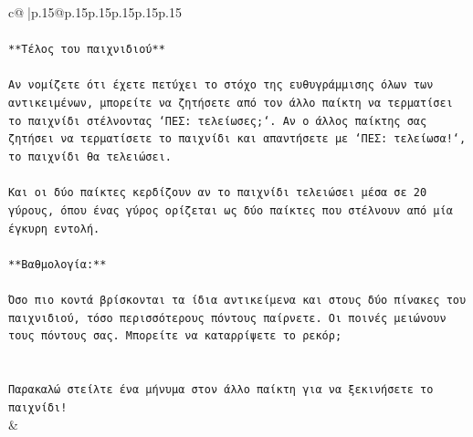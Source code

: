 \documentclass{article}
\begin{document}
{\begin{supertabular}{c@{$\;$}|p{.15\linewidth}@{}p{.15\linewidth}p{.15\linewidth}p{.15\linewidth}p{.15\linewidth}p{.15\linewidth}}
{{{\\ 
\\ 
\texttt{**Τέλος του παιχνιδιού**} \\
\\ 
\texttt{Αν νομίζετε ότι έχετε πετύχει το στόχο της ευθυγράμμισης όλων των αντικειμένων, μπορείτε να ζητήσετε από τον άλλο παίκτη να τερματίσει το παιχνίδι στέλνοντας `ΠΕΣ: τελείωσες;`. Αν ο άλλος παίκτης σας ζητήσει να τερματίσετε το παιχνίδι και απαντήσετε με `ΠΕΣ: τελείωσα!`, το παιχνίδι θα τελειώσει.} \\
\\ 
\texttt{Και οι δύο παίκτες κερδίζουν αν το παιχνίδι τελειώσει μέσα σε 20 γύρους, όπου ένας γύρος ορίζεται ως δύο παίκτες που στέλνουν από μία έγκυρη εντολή.} \\
\\ 
\texttt{**Βαθμολογία:**} \\
\\ 
\texttt{Όσο πιο κοντά βρίσκονται τα ίδια αντικείμενα και στους δύο πίνακες του παιχνιδιού, τόσο περισσότερους πόντους παίρνετε. Οι ποινές μειώνουν τους πόντους σας. Μπορείτε να καταρρίψετε το ρεκόρ;} \\
\\ 
\\ 
\texttt{Παρακαλώ στείλτε ένα μήνυμα στον άλλο παίκτη για να ξεκινήσετε το παιχνίδι!} \\
            }
        }
    }
    & \\ \\


\end{supertabular}}
\end{document}
